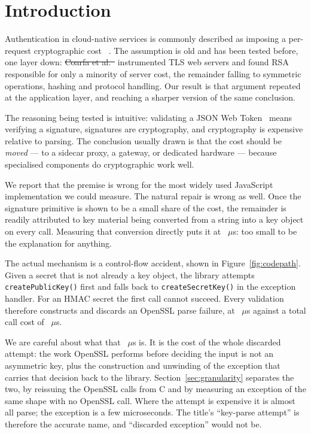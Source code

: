 \documentclass[pdflatex,sn-basic,twocolumn]{sn-jnl}%
\providecommand{\DIFdel}[1]{{\protect\color{red}\sout{#1}}}                      %
\providecommand{\DIFaddbegin}{} %
\providecommand{\DIFaddend}{} %
\providecommand{\DIFdelbegin}{} %
\providecommand{\DIFdelend}{} %
\newcommand{\DIFscaledelfig}{0.5}
\newlength{\DIFdelgraphicswidth} %
\newlength{\DIFdelgraphicsheight} %
\newcommand{\DIFaddincludegraphics}[2][]{{\color{blue}\fbox{\DIFOincludegraphics[#1]{#2}}}} %
\newcommand{\DIFdelincludegraphics}[2][]{%
\sbox{\DIFdelgraphicsbox}{\DIFOincludegraphics[#1]{#2}}%
\settoboxwidth{\DIFdelgraphicswidth}{\DIFdelgraphicsbox} %
\settoboxtotalheight{\DIFdelgraphicsheight}{\DIFdelgraphicsbox} %
\scalebox{\DIFscaledelfig}{%
\parbox[b]{\DIFdelgraphicswidth}{\usebox{\DIFdelgraphicsbox}\\[-\baselineskip] \rule{\DIFdelgraphicswidth}{0em}}\llap{\resizebox{\DIFdelgraphicswidth}{\DIFdelgraphicsheight}{%
\setlength{\unitlength}{\DIFdelgraphicswidth}%
\begin{picture}(1,1)%
\thicklines\linethickness{2pt} %
{\color[rgb]{1,0,0}\put(0,0){\framebox(1,1){}}}%
{\color[rgb]{1,0,0}\put(0,0){\line( 1,1){1}}}%
{\color[rgb]{1,0,0}\put(0,1){\line(1,-1){1}}}%
\end{picture}%
}\hspace*{3pt}}} %
} %
\DeclareRobustCommand{\DIFaddbegin}{\DIFOaddbegin \let\includegraphics\DIFaddincludegraphics} %
\DeclareRobustCommand{\DIFaddend}{\DIFOaddend \let\includegraphics\DIFOincludegraphics} %
\DeclareRobustCommand{\DIFdelbegin}{\DIFOdelbegin \let\includegraphics\DIFdelincludegraphics} %
\DeclareRobustCommand{\DIFdelend}{\DIFOaddend \let\includegraphics\DIFOincludegraphics} %
\begin{document}
\section{Introduction}\label{sec:intro}

Authentication in cloud-native services is commonly described as imposing a
per-request cryptographic cost~\DIFdelbegin %
\DIFdelend \DIFaddbegin \citep{zhu2023dissecting}\DIFaddend .
The assumption is old and has been tested before, one layer down: \DIFdelbegin \DIFdel{Coarfa et
al.~}%
\DIFdelend \DIFaddbegin \citet{coarfa2006performance} \DIFaddend instrumented TLS web servers and found RSA
responsible for only a minority of server cost, the remainder falling to
symmetric operations, hashing and protocol handling. Our result is that
argument repeated at the application layer, and reaching a sharper version of
the same conclusion.

The reasoning being tested is intuitive: validating a JSON Web
Token~\DIFdelbegin %
\DIFdelend \DIFaddbegin \citep{rfc7519} \DIFaddend means verifying a signature, signatures are cryptography,
and cryptography is expensive relative to parsing. The conclusion usually drawn
is that the cost should be \emph{moved} --- to a sidecar proxy, a gateway, or
dedicated hardware --- because specialised components do cryptographic work
well.

We report that the premise is wrong for the most widely used JavaScript
implementation we could measure. The natural repair is wrong as well. Once the
signature primitive is shown to be a small share of the cost, the remainder is
readily attributed to key material being converted from a string into a key
object on every call. Measuring that conversion directly puts it at
\HostCreateSecretKey~$\mu$s: too small to be the explanation for anything.

The actual mechanism is a control-flow accident, shown in
Figure~\ref{fig:codepath}. Given a secret that is not already a key object, the
library attempts \texttt{createPublicKey()} first and falls back to
\texttt{createSecretKey()} in the exception handler. For an HMAC secret the
first call cannot succeed. Every validation therefore constructs and discards
an OpenSSL parse failure, at \HostProbeThrows~$\mu$s against a total call cost
of \HostJwtString~$\mu$s.

We are careful about what that \HostProbeThrows~$\mu$s is. It is the cost of
the whole discarded attempt: the work OpenSSL performs before deciding the
input is not an asymmetric key, plus the construction and unwinding of the
exception that carries that decision back to the library.
Section~\ref{sec:granularity} separates the two, by reissuing the OpenSSL calls
from C and by measuring an exception of the same shape with no OpenSSL call.
Where the attempt is expensive it is almost all parse; the exception is a few
microseconds. The title's ``key-parse attempt'' is therefore the accurate
name, and ``discarded exception'' would not be.
\end{document}
